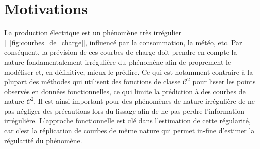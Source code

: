 \chapter{Motivations}
\minitoc%



\smallskip



\bigskip

\noindent
{}

\pagebreak



\pagebreak



\pagebreak




La production électrique est un phénomène très irrégulier [~\ref{fig:courbes_de_charge}], influencé par la consommation, la météo, etc. Par conséquent, la prévision de ces courbes de charge doit prendre en compte la nature fondamentalement irrégulière du phénomène afin de proprement le modéliser et, en définitive, mieux le prédire. Ce qui est notamment contraire à la plupart des méthodes qui utilisent des fonctions de classe $\mathcal C^2$ pour lisser les points observés en données fonctionnelles, ce qui limite la prédiction à des courbes de nature $\mathcal C^2$. Il est ainsi important pour des phénomènes de nature irrégulière de ne pas négliger des précautions lors du lissage afin de ne pas perdre l'information irrégulière. L'approche fonctionnelle est clé dans l'estimation de cette régularité, car c'est la réplication de courbes de même nature qui permet in-fine d'estimer la régularité du phénomène.







